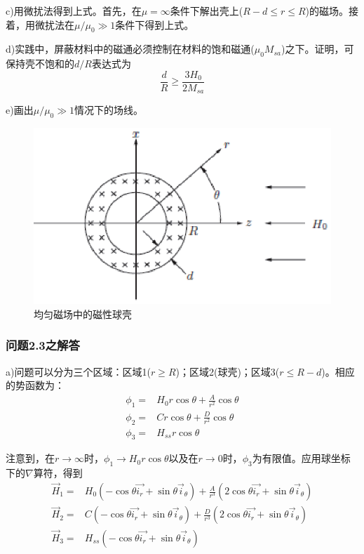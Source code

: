 c)用微扰法得到上式。首先，在$\mu=\infty$条件下解出壳上($R-d\le r\le R$)的磁场。接着，用微扰法在$\mu/\mu_0 \gg 1$条件下得到上式。

d)实践中，屏蔽材料中的磁通必须控制在材料的饱和磁通($\mu_0 M_{sa}$)之下。证明，可保持壳不饱和的$d/R$表达式为
\begin{equation}
\frac{d}{R} \ge \frac{3H_0}{2M_{sa}}
\end{equation}

e)画出$\mu/\mu_0 \gg 1$情况下的场线。

\begin{figure}[htbp]
  \centering
 \includegraphics[scale=0.9]{chpt2/figs/fig2.4.eps}
  \caption{均匀磁场中的磁性球壳}
\end{figure}

\subsubsection*{问题2.3之解答}
a)问题可以分为三个区域：区域1($r\ge R$)；区域2(球壳)；区域3($r\le R-d$)。相应的势函数为：
\begin{align}
  \phi_1 =& H_0 r\cos\theta+\frac{A}{r^2}\cos\theta \tag{S3.1a} \\
  \phi_2 =& C r \cos\theta+\frac{D}{r^2}\cos\theta\tag{S3.1b} \\
  \phi_3 =& H_{ss} r\cos\theta  \tag{S3.1c}
\end{align}

注意到，在$r\rightarrow \infty$时，$\phi_1 \rightarrow H_0 r\cos\theta$以及在$r\rightarrow 0$时，$\phi_3$为有限值。应用球坐标下的$\nabla$算符，得到
\begin{align}
  \vec{H}_1 =& H_0 (-\cos\theta\vec{i_r}+\sin\theta\vec{i}_\theta)+\frac{A}{r^3} (2\cos\theta\vec{i_r}+\sin\theta\vec{i}_\theta) \tag{S3.2a}\\
  \vec{H}_2 =& C(-\cos\theta\vec{i_r}+\sin\theta\vec{i}_\theta)+\frac{D}{r^3} (2\cos\theta\vec{i_r}+\sin\theta\vec{i}_\theta)  \tag{S3.2b}\\
   \vec{H}_3 =& H_{ss}  (-\cos\theta\vec{i_r}+\sin\theta\vec{i}_\theta)  \tag{S3.2c}
\end{align}

